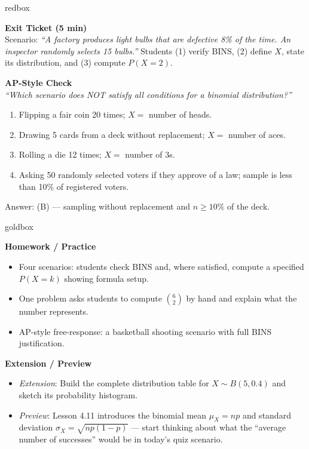 \documentclass[10pt]{article}
\begin{document}
\begin{skillbox}{redbox}
\begin{minipage}[t]{0.48\linewidth}
    \textbf{Exit Ticket (5 min)}\\
    Scenario: \textit{``A factory produces light bulbs that are defective 8\% of the
    time. An inspector randomly selects 15 bulbs.''} Students (1) verify BINS, (2)
    define $X$, state its distribution, and (3) compute $P(X = 2)$.
\end{minipage}
\hfill
\begin{minipage}[t]{0.48\linewidth}
    \textbf{AP-Style Check}\\
    \textit{``Which scenario does NOT satisfy all conditions for a binomial
    distribution?''}
    \begin{enumerate}[label=(\Alph*)]
        \item Flipping a fair coin 20 times; $X =$ number of heads.
        \item Drawing 5 cards from a deck without replacement; $X =$ number of aces.
        \item Rolling a die 12 times; $X =$ number of 3s.
        \item Asking 50 randomly selected voters if they approve of a law; sample
              is less than 10\% of registered voters.
    \end{enumerate}
    Answer: (B) --- sampling without replacement and $n \ge 10\%$ of the deck.
\end{minipage}
\end{skillbox}

\begin{skillbox}{goldbox}
\begin{minipage}[t]{0.48\linewidth}
    \textbf{Homework / Practice}
    \begin{itemize}
        \item Four scenarios: students check BINS and, where satisfied, compute
              a specified $P(X = k)$ showing formula setup.
        \item One problem asks students to compute $\binom{6}{2}$ by hand and
              explain what the number represents.
        \item AP-style free-response: a basketball shooting scenario with full
              BINS justification.
    \end{itemize}
\end{minipage}
\hfill
\begin{minipage}[t]{0.48\linewidth}
    \textbf{Extension / Preview}
    \begin{itemize}
        \item \textit{Extension}: Build the complete distribution table for
              $X \sim B(5, 0.4)$ and sketch its probability histogram.
        \item \textit{Preview}: Lesson 4.11 introduces the binomial mean
              $\mu_X = np$ and standard deviation $\sigma_X = \sqrt{np(1-p)}$
              --- start thinking about what the ``average number of successes''
              would be in today's quiz scenario.
    \end{itemize}
\end{minipage}
\end{skillbox}
\end{document}
